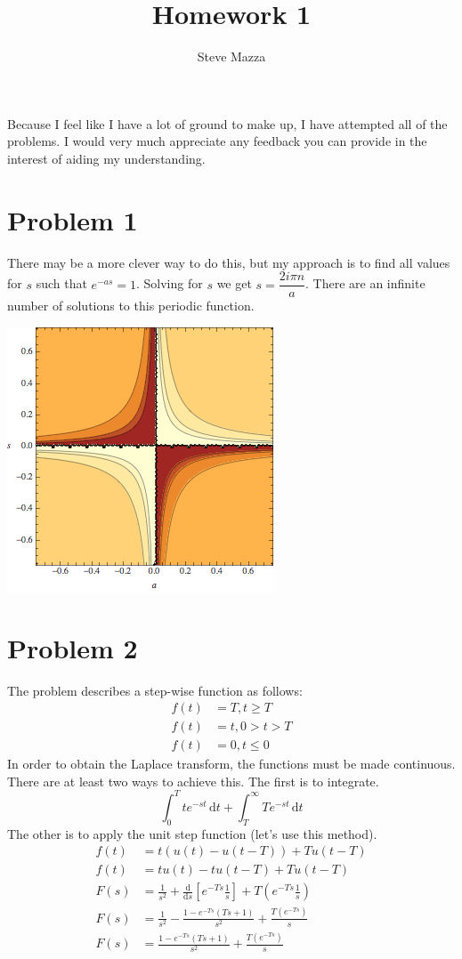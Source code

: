 \documentclass[letterpaper,10pt]{article}
\title{Homework 1}
\author{Steve Mazza}
\begin{document}
\maketitle

Because I feel like I have a lot of ground to make up, I have attempted all of the problems.  I would very much appreciate any feedback you can provide in the interest of aiding my understanding.

\section*{Problem 1}
There may be a more clever way to do this, but my approach is to find all values for $s$ such that $e^{-as}=1$.  Solving for $s$ we get $s=\dfrac{2i\pi n}{a}$.  There are an infinite number of solutions to this periodic function.
\begin{center}
	\includegraphics[scale=0.75]{plot.png}
\end{center}

\section*{Problem 2}
The problem describes a step-wise function as follows:
\begin{align}
	f(t) &= T, t\geq T \\
	f(t) &= t, 0 > t > T \\
	f(t) &= 0, t\leq 0
\end{align}
In order to obtain the Laplace transform, the functions must be made continuous.  There are at least two ways to achieve this.  The first is to integrate.
\begin{equation}
	\int_0^T te^{-st} \, \mathrm{d} t + \int_{T}^{\infty} Te^{-st}\, \mathrm{d}t
\end{equation}
The other is to apply the unit step function (let's use this method).
\begin{align}
	f(t) &= t(u(t)-u(t-T))+Tu(t-T) \\
	f(t) &= tu(t)-tu(t-T)+Tu(t-T) \\
	F(s) &= \frac{1}{s^{2}} + \frac{\mathrm{d}}{\mathrm{d}s}\left[e^{-Ts}\frac{1}{s}\right] + T\left(e^{-Ts}\frac{1}{s}\right) \\
	F(s) &= \frac{1}{s^{2}} - \frac{1 - e^{-Ts}\left(Ts+1\right)}{s^{2}} + \frac{T\left(e^{-Ts}\right)}{s} \\
	F(s) &= \frac{1-e^{-Ts}\left(Ts+1\right)}{s^{2}} + \frac{T\left(e^{-Ts}\right)}{s}
\end{align}
\end{document}
